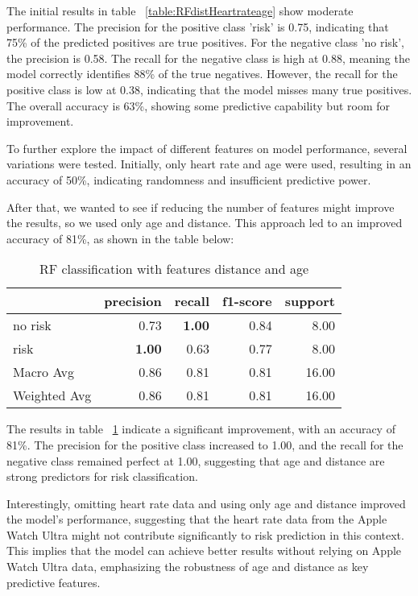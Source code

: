 The initial results in table ~\ref{table:RFdistHeartrateage} show moderate performance. The precision for the positive class 'risk' is 0.75, indicating that 75\% of the predicted positives are true positives. For the negative class 'no risk', the precision is 0.58. The recall for the negative class is high at 0.88, meaning the model correctly identifies 88\% of the true negatives. However, the recall for the positive class is low at 0.38, indicating that the model misses many true positives. The overall accuracy is 63\%, showing some predictive capability but room for improvement.

To further explore the impact of different features on model performance, several variations were tested. Initially, only heart rate and age were used, resulting in an accuracy of 50\%, indicating randomness and insufficient predictive power.

After that, we wanted to see if reducing the number of features might improve the results, so we used only age and distance. This approach led to an improved accuracy of 81\%, as shown in the table below:

\begin{table}[H]
\centering
\begin{tabular}{lrrrr}
\toprule
{} & precision & recall & f1-score & support \\
\midrule
no risk & 0.73 & \textbf{1.00} & 0.84 & 8.00 \\
risk & \textbf{1.00} & 0.63 & 0.77 & 8.00 \\
Macro Avg & 0.86 & 0.81 & 0.81 & 16.00 \\
Weighted Avg & 0.86 & 0.81 & 0.81 & 16.00 \\
\bottomrule
\end{tabular}
\caption{RF classification with features distance and age}
\label{table:RFdistage}
\end{table}

The results in table ~\ref{table:RFdistage} indicate a significant improvement, with an accuracy of 81\%. The precision for the positive class increased to 1.00, and the recall for the negative class remained perfect at 1.00, suggesting that age and distance are strong predictors for risk classification.

Interestingly, omitting heart rate data and using only age and distance improved the model's performance, suggesting that the heart rate data from the Apple Watch Ultra might not contribute significantly to risk prediction in this context. This implies that the model can achieve better results without relying on Apple Watch Ultra data, emphasizing the robustness of age and distance as key predictive features.

